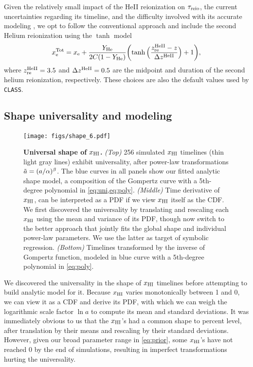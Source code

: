 Given the relatively small impact of the HeII reionization on
$\tau_{\mathrm{reio}}$, the current uncertainties regarding its timeline, and the
difficulty involved with its accurate modeling \cite{Hotinli2023,
Upton2020}, we opt to follow the conventional approach and include the
second Helium reionization using the $\tanh$ model
%
\begin{equation}
\label{eq:xe_tot}
x_{\mathrm{e}}^\mathrm{Tot} = x_{\mathrm{e}} + \frac{Y_{\mathrm{He}}}{2C(1 - Y_{\mathrm{He}})}
  \biggl(\tanh{\Bigl(\frac{z_{\mathrm{re}}^{\mathrm{HeII}}- z}{\Delta z^{\mathrm{HeII}}}\Bigr)} + 1\biggr),
\end{equation}
%
where $z_{\mathrm{re}}^{\mathrm{HeII}} = 3.5$ and $\Delta z^{\mathrm{HeII}} = 0.5$ are the midpoint
and duration of the second helium reionization, respectively.
These choices are also the default values used by \texttt{CLASS}.


\subsection*{Shape universality and modeling}
\label{ssec:shape}

\begin{figure}[tb]
\centering
\texttt{[image: figs/shape\_6.pdf]}
\caption{\textbf{Universal shape of $x_{\mathrm{HI}}$.}
\emph{(Top)} 256 simulated $x_{\mathrm{HI}}$ timelines (thin light gray lines)
exhibit universality, after power-law transformations $\tilde{a} =
(a/\alpha)^\beta$.
The blue curves in all panels show our fitted analytic shape model, a
composition of the Gompertz curve with a 5th-degree polynomial in
\cref{eq:uni,eq:poly}.
\emph{(Middle)} Time derivative of $x_{\mathrm{HI}}$, can be interpreted as a PDF
if we view $x_{\mathrm{HI}}$ itself as the CDF.
We first discovered the universality by translating and rescaling each
$x_{\mathrm{HI}}$ using the mean and variance of its PDF, though now switch to the
better approach that jointly fits the global shape and individual
power-law parameters.
We use the latter as target of symbolic regression.
\emph{(Bottom)} Timelines transformed by the inverse of Gompertz
function, modeled in blue curve with a 5th-degree polynomial in
\cref{eq:poly}.}
\label{fig:shape}
\end{figure}

We discovered the universality in the shape of $x_{\mathrm{HI}}$ timelines before
attempting to build analytic model for it.
Because $x_{\mathrm{HI}}$ varies monotonically between 1 and 0, we can view it as
a CDF and derive its PDF, with which we can weigh the logarithmic scale
factor $\ln a$ to compute its mean and standard deviations.
It was immediately obvious to us that the $x_{\mathrm{HI}}$'s had a common shape
to percent level, after translation by their means and rescaling by
their standard deviations.
However, given our broad parameter range in \cref{eq:prior}, some
$x_{\mathrm{HI}}$'s have not reached 0 by the end of simulations, resulting in
imperfect transformations hurting the universality.

